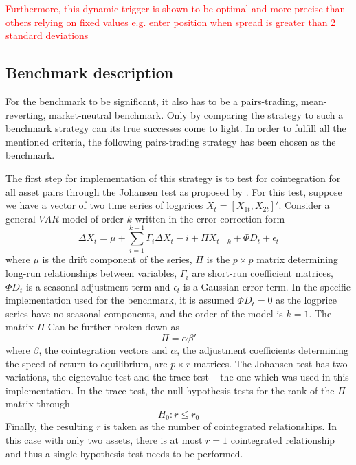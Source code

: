 \textcolor{red}{Furthermore, this dynamic trigger is shown to be optimal and more precise than others relying on fixed values e.g. enter position when spread is greater than 2 standard deviations}  

\subsection{Benchmark description}
For the benchmark to be significant, it also has to be a pairs-trading, mean-reverting, market-neutral benchmark. Only by comparing the strategy to such a benchmark strategy can its true successes come to light. In order to fulfill all the mentioned criteria, the following pairs-trading strategy has been chosen as the benchmark. 

The first step for implementation of this strategy is to test for cointegration for all asset pairs through the Johansen test as proposed by \cite{johansen_1991}. 
For this test, suppose we have a vector of two time series of logprices  $X_t=[X_{1t},X_{2t}]'$. 
Consider a general $VAR$ model of order $k$ written in the error correction form 
\begin{equation}
    \Delta X_t = \mu + \sum_{i=1}^{k-1}{\Gamma_i \Delta X_t-i} + \Pi X_{t-k} + \Phi D_t + \epsilon_t
\end{equation}
where $\mu$ is the drift component of the series, $\Pi$ is the $p\times p$ matrix determining long-run relationships between variables, $\Gamma_i$ are short-run coefficient matrices, $\Phi D_t$ is a seasonal adjustment term and $\epsilon_t$ is a Gaussian error term. In the specific implementation used for the benchmark, it is assumed $\Phi D_t=0$ as the logprice series have no seasonal components, and the order of the model is $k=1$. 
The matrix $\Pi$ Can be further broken down as 
\begin{equation}
    \Pi=\alpha \beta '
\end{equation}
where $\beta$, the cointegration vectors and $\alpha$, the adjustment coefficients determining the speed of return to equilibrium, are $p\times r$ matrices. 
The Johansen test has two variations, the eignevalue test and the trace test -- the one which was used in this implementation. In the trace test, the null hypothesis tests for the rank of the $\Pi$ matrix through
\begin{equation}
    H_0: r \leq r_0
\end{equation}
Finally, the resulting $r$ is taken as the number of cointegrated relationships. In this case with only two assets, there is at most $r=1$ cointegrated relationship and thus a single hypothesis test needs to be performed. 

